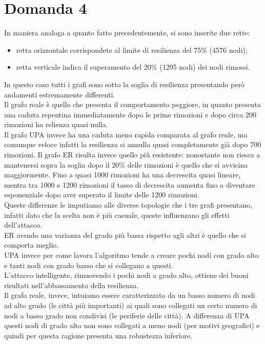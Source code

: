 \documentclass{article}
\begin{document}
\section*{Domanda 4}
In maniera analoga a quanto fatto precedentemente, si sono inserite due rette:
\begin{itemize}
	\item retta orizzontale corrispondete al limite di resilienza del 75\% (4576 nodi);
	\item retta verticale indica il superamento del 20\% (1295 nodi) dei nodi rimossi. 
\end{itemize}
In questo caso tutti i grafi sono sotto la soglia di resilienza presentando però andamenti estremamente differenti.\\
Il grafo reale è quello che presenta il comportamento peggiore, in quanto presenta una caduta repentina immediatamente dopo le prime rimozioni e dopo circa 200 rimozioni ha relienza quasi nulla.\\
Il grafo UPA invece ha una caduta meno rapida comparata al grafo reale, ma comunque veloce infatti la resilienza si annulla quasi completamente già dopo 700 rimozioni.
Il grafo ER risulta invece quello più resistente: nonostante non riesca a mantenersi sopra la soglia dopo il 20\% delle rimozioni è quello che si avvicina maggiormente. Fino a quasi 1000 rimozioni ha una decrescita quasi lineare, mentra tra 1000 e 1200 rimozioni il tasso di decrescita aumenta fino a diventare esponenziale dopo aver superato il limite delle 1200 rimozioni.\\
Queste differenze le imputiamo alle diverse topologie che i tre grafi presentano, infatti dato che la scelta non è più casuale, queste influenzano gli effetti dell'attacco.\\
ER avendo una varianza del grado più bassa rispetto agli altri è quello che si comporta meglio.\\
UPA invece per come lavora l'algoritmo tende a creare pochi nodi con grado alto e tanti nodi con grado basso che si collegano a questi.\\
L'attacco intelligente, rimuovendo i pochi nodi a grado alto, ottiene dei buoni risultati nell'abbassamento della resilienza.\\
Il grafo reale, invece, intuiamo essere caratterizzato da un basso numero di nodi ad alto grado (le città più importanti) ai quali sono collegati un certo numero di nodi a basso grado non condivisi (le periferie delle città). A differenza di UPA questi nodi di grado alto non sono collegati a meno nodi (per motivi geografici) e quindi per questa ragione presenta una robustezza inferiore.
\end{document}

